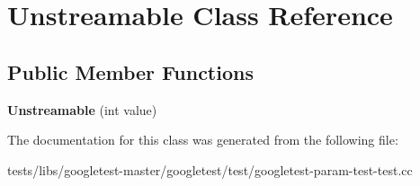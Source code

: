 \hypertarget{classUnstreamable}{}\section{Unstreamable Class Reference}
\label{classUnstreamable}
\subsection*{Public Member Functions}
\begin{DoxyCompactItemize}
\item 
\mbox{\label{classUnstreamable_aec8af0d0f78468a9094f1b36332a0842}} 
{\bfseries Unstreamable} (int value)
\end{DoxyCompactItemize}


The documentation for this class was generated from the following file\+:\begin{DoxyCompactItemize}
\item 
tests/libs/googletest-\/master/googletest/test/googletest-\/param-\/test-\/test.\+cc\end{DoxyCompactItemize}
